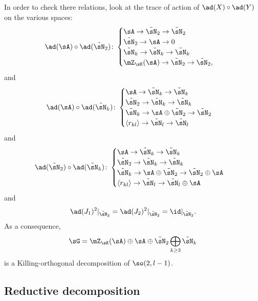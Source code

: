 In order to check there relations, look at the trace of action of $\ad(X)\circ\ad(Y)$ on the various spaces:
\begin{equation}
	\ad(\sA)\circ\ad(\tilde\sN_2) \colon
	\begin{cases}
		\sA\to\tilde\sN_2\to\tilde\sN_2\\
		\tilde\sN_2\to\sA\to 0\\
		\tilde\sN_k\to\tilde\sN_k\to\tilde\sN_k\\
		\mZ_{\sK}(\sA)\to\tilde\sN_2\to\tilde\sN_2,
	\end{cases}
\end{equation}
and
\begin{equation}
	\ad(\sA)\circ\ad(\tilde\sN_k)\colon
	\begin{cases}
		\sA\to\tilde\sN_k\to\tilde\sN_k\\
		\tilde\sN_2\to\tilde\sN_k\to\tilde\sN_k\\
		\tilde\sN_k\to\sA\oplus\tilde\sN_2\to\tilde\sN_2\\
		\langle r_{kl}\rangle\to\tilde\sN_l\to\tilde\sN_l
	\end{cases}
\end{equation}
and
\begin{equation}
	\ad(\tilde\sN_2)\circ\ad(\tilde\sN_k)\colon
	\begin{cases}
		\sA\to\tilde\sN_k\to\tilde\sN_k\\
		\tilde\sN_2\to\tilde\sN_k\to\tilde\sN_k\\
		\tilde\sN_k\to\sA\oplus\tilde\sN_2\to\tilde\sN_2\oplus\sA\\
		\langle r_{kl}\rangle\to\tilde\sN_l\to\tilde\sN_l\oplus\sA
	\end{cases}
\end{equation}
and
\begin{equation}
	\ad(J_1)^2|_{\tilde\sN_2}=\ad(J_2)^2|_{\tilde\sN_2}=\id|_{\tilde\sN_2}.
\end{equation}
%
As a consequence,
\begin{equation}		\label{LONGEqDecompGPourKillOrtho}
	\sG=\mZ_{\sK}(\sA)\oplus\sA\oplus\tilde\sN_2\bigoplus_{k\geq 3}\tilde\sN_k
\end{equation}
is a Killing-orthogonal decomposition of $\so(2,l-1)$.

%
\subsection{Reductive decomposition}
%
\label{LONGSubSecReductiveDecompQ}

